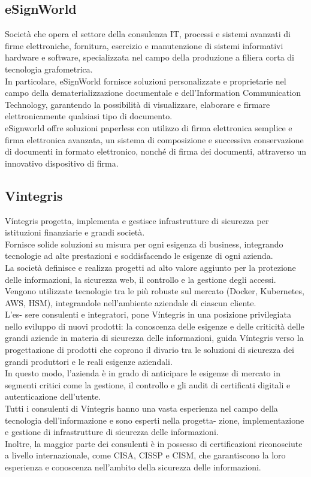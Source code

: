 \subsection{eSignWorld}
Società che opera el settore della consulenza IT, processi e sistemi avanzati di firme elettroniche,
fornitura, esercizio e manutenzione di sistemi informativi hardware e software, specializzata nel
campo della produzione a filiera corta di tecnologia grafometrica.\\ In particolare, eSignWorld
fornisce soluzioni personalizzate e proprietarie nel campo della dematerializzazione documentale
e dell'Information Communication Technology, garantendo la possibilità di visualizzare,
elaborare e firmare elettronicamente qualsiasi tipo di documento.\\ eSignworld offre soluzioni
paperless con utilizzo di firma elettronica semplice e firma elettronica avanzata, un sistema di
composizione e successiva conservazione di documenti in formato elettronico, nonché di firma dei
documenti, attraverso un innovativo dispositivo di firma.
\subsection{Vintegris}
Víntegris progetta, implementa e gestisce infrastrutture di sicurezza per istituzioni finanziarie
e grandi società.\\ Fornisce solide soluzioni su misura per ogni esigenza di business, integrando
tecnologie ad alte prestazioni e soddisfacendo le esigenze di ogni azienda.\\ La società definisce e
realizza progetti ad alto valore aggiunto per la protezione delle informazioni, la sicurezza web, il
controllo e la gestione degli accessi.\\ Vengono utilizzate tecnologie tra le più robuste sul mercato
(Docker, Kubernetes, AWS, HSM), integrandole nell'ambiente aziendale di ciascun cliente.\\ L'es-
sere consulenti e integratori, pone Víntegris in una posizione privilegiata nello sviluppo di nuovi
prodotti: la conoscenza delle esigenze e delle criticità delle grandi aziende in materia di sicurezza
delle informazioni, guida Víntegris verso la progettazione di prodotti che coprono il divario tra le
soluzioni di sicurezza dei grandi produttori e le reali esigenze aziendali.\\ In questo modo, l'azienda
è in grado di anticipare le esigenze di mercato in segmenti critici come la gestione, il controllo e
gli audit di certificati digitali e autenticazione dell'utente.\\ Tutti i consulenti di Víntegris hanno
una vasta esperienza nel campo della tecnologia dell'informazione e sono esperti nella progetta-
zione, implementazione e gestione di infrastrutture di sicurezza delle informazioni.\\ Inoltre, la
maggior parte dei consulenti è in possesso di certificazioni riconosciute a livello internazionale,
come CISA, CISSP e CISM, che garantiscono la loro esperienza e conoscenza nell'ambito della
sicurezza delle informazioni.

